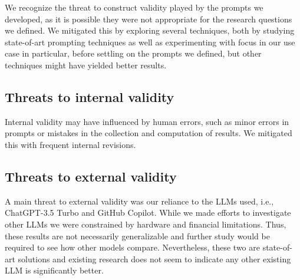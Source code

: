 We recognize the threat to construct validity played by the prompts we developed, as it is possible they were not appropriate for the research questions
we defined. We mitigated this by exploring several techniques, both by studying state-of-art prompting techniques as well as experimenting with focus in our use case in particular, before settling on the prompts we defined, but other techniques might have yielded better
results.

\subsection{Threats to internal validity}

Internal validity may have influenced by human errors, such as minor errors in prompts or mistakes in the collection and computation of results.
We mitigated this with frequent internal revisions. %

\subsection{Threats to external validity}

A main threat to external validity was our reliance to the LLMs used, i.e., ChatGPT-3.5 Turbo and GitHub Copilot. While we made efforts to investigate other LLMs
we were constrained by hardware and financial limitations. Thus, these results are not necessarily generalizable and further study would be required to see how other models compare.  Nevertheless, these two are state-of-art solutions and existing research
does not seem to indicate any other existing LLM is significantly better.
